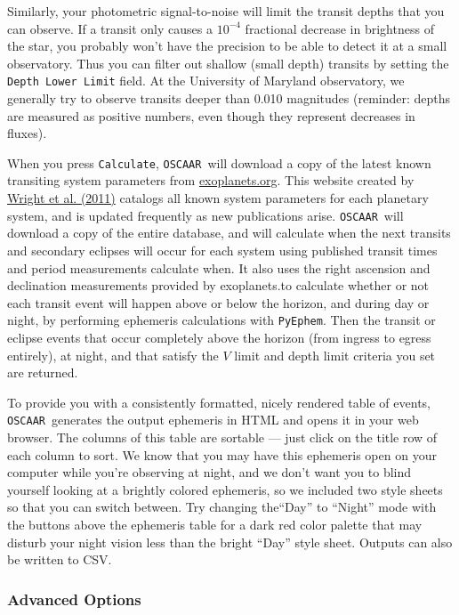 \documentclass[a4paper]{article}
\newcommand{\code}[1]{\texttt{#1}}
\newcommand{\oscaar}{\code{OSCAAR}~}
\begin{document}
Similarly, your photometric signal-to-noise will limit the transit depths that you can observe. If a transit only causes a $10^{-4}$ fractional decrease in brightness of the star, you probably won't have the precision to be able to detect it at a small observatory. Thus you can filter out shallow (small depth) transits by setting the \code{Depth Lower Limit} field. At the University of Maryland observatory, we generally try to observe transits deeper than 0.010 magnitudes (reminder: depths are measured as positive numbers, even though they represent decreases in fluxes).

When you press \code{Calculate}, \oscaar will download a copy of the latest known transiting system parameters from \href{http://www.exoplanets.org/}{exoplanets.org}. This website created by \href{http://adsabs.harvard.edu/abs/2011PASP..123..412W}{Wright et al. (2011)} catalogs all known system parameters for each planetary system, and is updated frequently as new publications arise. \oscaar will download a copy of the entire database, and will calculate when the next transits and secondary eclipses will occur for each system using published transit times and period measurements calculate when. It also uses the right ascension and declination measurements provided by exoplanets.\@org to calculate whether or not each transit event will happen above or below the horizon, and during day or night, by performing ephemeris calculations with \code{PyEphem}. Then the transit or eclipse events that occur completely above the horizon (from ingress to egress entirely), at night, and that satisfy the $V$ limit and depth limit criteria you set are returned. 

To provide you with a consistently formatted, nicely rendered table of events, \oscaar generates the output ephemeris in HTML and opens it in your web browser. The columns of this table are sortable --- just click on the title row of each column to sort. We know that you may have this ephemeris open on your computer while you're observing at night, and we don't want you to blind yourself looking at a brightly colored ephemeris, so we included two style sheets so that you can switch between. Try changing the``Day'' to ``Night'' mode with the buttons above the ephemeris table for a dark red color palette that may disturb your night vision less than the bright ``Day'' style sheet. Outputs can also be written to CSV.

\subsubsection{Advanced Options}
\end{document}
